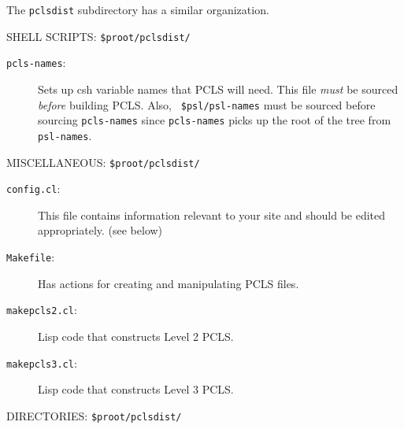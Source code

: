 The {\tt pclsdist} subdirectory has a similar organization.
\bigskip

\noindent
SHELL SCRIPTS: {\tt \$proot/pclsdist/} 

\begin{description}

\item[{\tt pcls-names}:]
Sets up csh variable names that PCLS will need.  This file
{\it must} be sourced {\it before} building PCLS.  Also, {\tt
\$psl/psl-names} must be sourced before sourcing {\tt pcls-names}
since {\tt pcls-names} picks up the root of the tree from {\tt psl-names}.

\end{description}

\noindent
MISCELLANEOUS: {\tt \$proot/pclsdist/} 

\begin{description}

\item[{\tt config.cl}:]
This file contains information relevant to your site and
should be edited appropriately. (see below)

\item[{\tt Makefile}:]
Has actions for creating and manipulating PCLS files.

\item[{\tt makepcls2.cl}:]
Lisp code that constructs Level 2 PCLS.

\item[{\tt makepcls3.cl}:]
Lisp code that constructs Level 3 PCLS.

\end{description}

\noindent
DIRECTORIES: {\tt \$proot/pclsdist/} 

